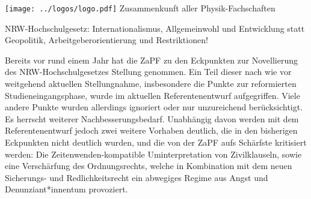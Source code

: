 \documentclass[DIV=calc]{scrartcl}
\let\oldgrqq=\grqq
\def\grqq{\oldgrqq\xspace}
\begin{document}
\hspace{0.87\textwidth}
\begin{minipage}{120pt}
	\vspace{-1.8cm}
	\texttt{[image: ../logos/logo.pdf]}
	\centering
	\small Zusammenkunft aller Physik-Fachschaften
\end{minipage}

\begin{center}
  \huge{NRW-Hochschulgesetz: Internationalismus,
Allgemeinwohl und Entwicklung statt Geopolitik,
Arbeitgeberorientierung und Restriktionen!}\vspace{.25\baselineskip}\\
  \normalsize
\end{center}
\vspace{1cm}






Bereits vor rund einem Jahr hat die ZaPF zu den Eckpunkten zur Novellierung des NRW-Hochschulgesetzes Stellung genommen. Ein Teil dieser nach wie vor weitgehend aktuellen Stellungnahme, insbesondere die Punkte zur reformierten
Studieneingangsphase, wurde im aktuellen Referentenentwurf aufgegriffen. Viele andere Punkte wurden allerdings ignoriert oder nur unzureichend berücksichtigt. Es herrscht weiterer Nachbesserungsbedarf.
Unabhängig davon werden mit dem Referentenentwurf jedoch zwei weitere Vorhaben deutlich, die in den bisherigen Eckpunkten nicht deutlich wurden, und die von der ZaPF aufs Schärfste kritisiert werden: Die \glqq Zeitenwenden\grqq-kompatible Uminterpretation von Zivilklauseln, sowie eine Verschärfung des Ordnungsrechts, welche in Kombination mit dem neuen Sicherungs- und Redlichkeitsrecht ein abwegiges Regime aus Angst und Denunziant*innentum provoziert. \\
\end{document}
